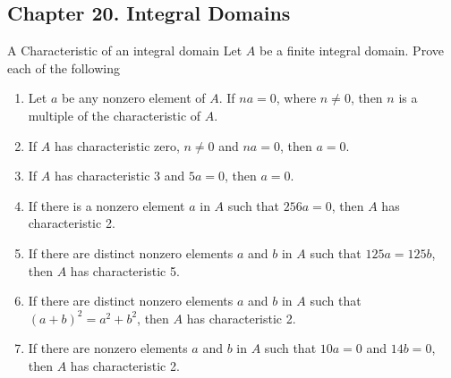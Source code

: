 \subsection*{Chapter 20. Integral Domains}


\begin{exercise}{A Characteristic of an integral domain}
Let $A$ be a finite integral domain. Prove each of the following
  \begin{enumerate}
      \item Let $a$ be any nonzero element of $A$. If $na=0$, where $n\neq0$, then $n$ is a multiple of the characteristic of $A$.
      \item If $A$ has characteristic zero, $n\neq 0$ and $na=0$, then $a=0$.
      \item If $A$ has characteristic 3 and $5a=0$, then $a=0$.
      \item If there is a nonzero element $a$ in $A$ such that $256a=0$, then $A$ has characteristic 2.
      \item If there are distinct nonzero elements $a$ and $b$ in $A$ such that $125a=125b$, then $A$ has characteristic 5.
      \item If there are distinct nonzero elements $a$ and $b$ in $A$ such that $(a+b)^{2}=a^{2}+b^{2}$, then $A$ has characteristic 2.
      \item If there are nonzero elements $a$ and $b$ in $A$ such that $10a=0$ and $14b=0$, then $A$ has characteristic 2.
  \end{enumerate}
\end{exercise}
